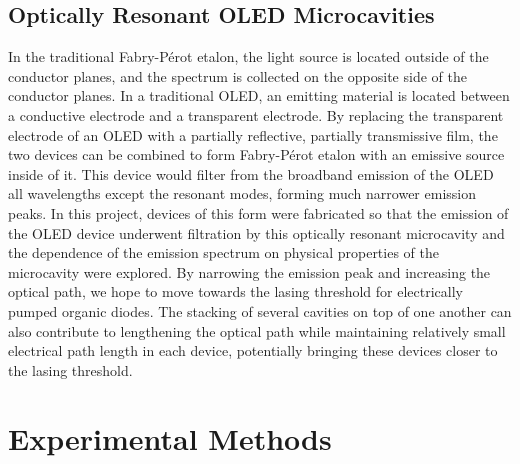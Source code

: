 \documentclass{report}
\begin{document}
    \section{Optically Resonant OLED Microcavities}
        In the traditional Fabry-P\'erot etalon, the light source is located outside of the conductor planes, and the spectrum is collected on the opposite side of the conductor planes. In a traditional OLED, an emitting material is located between a conductive electrode and a transparent electrode. By replacing the transparent electrode of an OLED with a partially reflective, partially transmissive film, the two devices can be combined to form Fabry-P\'erot etalon with an emissive source inside of it. This device would filter from the broadband emission of the OLED all wavelengths except the resonant modes, forming much narrower emission peaks.\cite{Hellerich2015} In this project, devices of this form were fabricated so that the emission of the OLED device underwent filtration by this optically resonant microcavity and the dependence of the emission spectrum on physical properties of the microcavity were explored. By narrowing the emission peak and increasing the optical path, we hope to move towards the lasing threshold for electrically pumped organic diodes. The stacking of several cavities on top of one another can also contribute to lengthening the optical path while maintaining relatively small electrical path length in each device, potentially bringing these devices closer to the lasing threshold.

\chapter{Experimental Methods} \label{methods}
\end{document}
